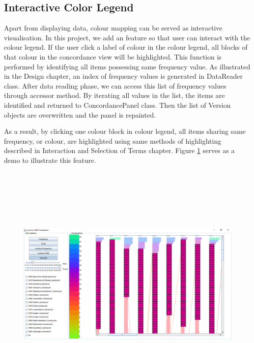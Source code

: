 \subsection{Interactive Color Legend}

Apart from displaying data, colour mapping can be served as interactive visualisation. In this project, we add an feature so that user can interact with the colour legend. If the user click a label of colour in the colour legend, all blocks of that colour in the concordance view will be highlighted. This function is performed by identifying all items possessing same frequency value. As illustrated in the Design chapter, an index of frequency values is generated in DataReader class. After data reading phase, we can access this list of frequency values through accessor method. By iterating all values in the list, the items are identified and returned to ConcordancePanel class. Then the list of Version objects are overwritten and the panel is repainted.

As a result, by clicking one colour block in colour legend, all items sharing same frequency, or colour, are highlighted using same methods of highlighting described in Interaction and Selection of Terms chapter. Figure \ref{fig:interactiveColourMapping} serves as a demo to illustrate this feature.
\begin{figure}[h]
	\centering	
	\includegraphics[width=16cm, height=12cm]{Figs/Colour-Legend-Interation}\\[1ex]
	\caption{}
	\label{fig:interactiveColourMapping}
\end{figure} 

